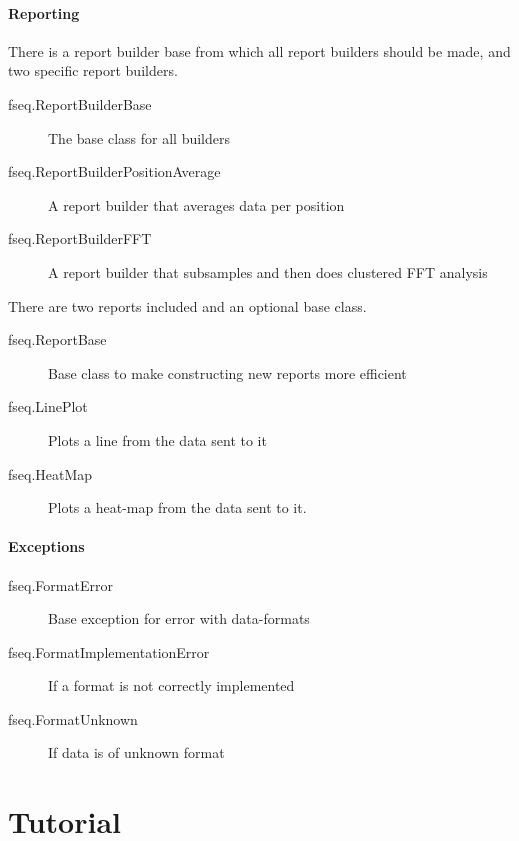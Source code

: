 \documentclass[letterpaper,10pt,english]{sphinxmanual}
\begin{document}
\paragraph{Reporting}
\label{fseq:reporting}
There is a report builder base from which all report builders should be
made, and two specific report builders.
\begin{description}
\item[{fseq.ReportBuilderBase}] \leavevmode
The base class for all builders

\item[{fseq.ReportBuilderPositionAverage}] \leavevmode
A report builder that averages data per position

\item[{fseq.ReportBuilderFFT}] \leavevmode
A report builder that subsamples and then does clustered FFT analysis

\end{description}

There are two reports included and an optional base class.
\begin{description}
\item[{fseq.ReportBase}] \leavevmode
Base class to make constructing new reports more efficient

\item[{fseq.LinePlot}] \leavevmode
Plots a line from the data sent to it

\item[{fseq.HeatMap}] \leavevmode
Plots a heat-map from the data sent to it.

\end{description}


\paragraph{Exceptions}
\label{fseq:exceptions}\begin{description}
\item[{fseq.FormatError}] \leavevmode
Base exception for error with data-formats

\item[{fseq.FormatImplementationError}] \leavevmode
If a format is not correctly implemented

\item[{fseq.FormatUnknown}] \leavevmode
If data is of unknown format

\end{description}


\section{Tutorial}
\label{tutorial::doc}\label{tutorial:tutorial}
\end{document}
